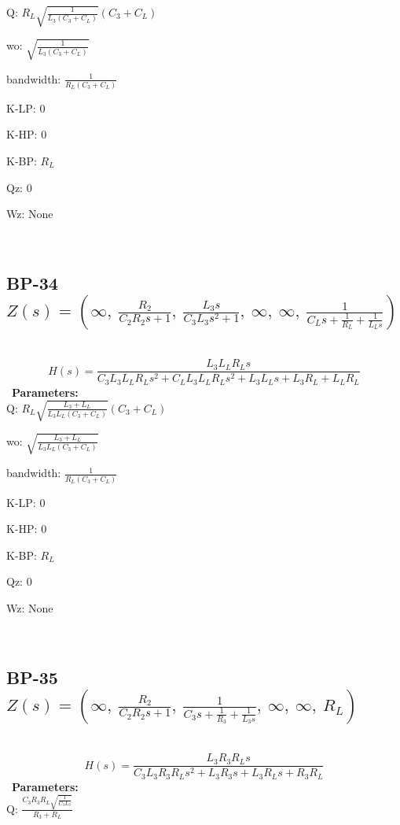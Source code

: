 \documentclass{article}
\begin{document}
Q: $R_{L} \sqrt{\frac{1}{L_{3} \left(C_{3} + C_{L}\right)}} \left(C_{3} + C_{L}\right)$\ 

wo: $\sqrt{\frac{1}{L_{3} \left(C_{3} + C_{L}\right)}}$\ 

bandwidth: $\frac{1}{R_{L} \left(C_{3} + C_{L}\right)}$\ 

K-LP: $0$\ 

K-HP: $0$\ 

K-BP: $R_{L}$\ 

Qz: $0$\ 

Wz: $\text{None}$\ 

\ 

\subsection{BP-34 $Z(s) = \left( \infty, \  \frac{R_{2}}{C_{2} R_{2} s + 1}, \  \frac{L_{3} s}{C_{3} L_{3} s^{2} + 1}, \  \infty, \  \infty, \  \frac{1}{C_{L} s + \frac{1}{R_{L}} + \frac{1}{L_{L} s}}\right)$ } \ 
\textbf{\[H(s) = \frac{L_{3} L_{L} R_{L} s}{C_{3} L_{3} L_{L} R_{L} s^{2} + C_{L} L_{3} L_{L} R_{L} s^{2} + L_{3} L_{L} s + L_{3} R_{L} + L_{L} R_{L}}\] } \ 
\textbf{Parameters:}\\ 

Q: $R_{L} \sqrt{\frac{L_{3} + L_{L}}{L_{3} L_{L} \left(C_{3} + C_{L}\right)}} \left(C_{3} + C_{L}\right)$\ 

wo: $\sqrt{\frac{L_{3} + L_{L}}{L_{3} L_{L} \left(C_{3} + C_{L}\right)}}$\ 

bandwidth: $\frac{1}{R_{L} \left(C_{3} + C_{L}\right)}$\ 

K-LP: $0$\ 

K-HP: $0$\ 

K-BP: $R_{L}$\ 

Qz: $0$\ 

Wz: $\text{None}$\ 

\ 

\subsection{BP-35 $Z(s) = \left( \infty, \  \frac{R_{2}}{C_{2} R_{2} s + 1}, \  \frac{1}{C_{3} s + \frac{1}{R_{3}} + \frac{1}{L_{3} s}}, \  \infty, \  \infty, \  R_{L}\right)$ } \ 
\textbf{\[H(s) = \frac{L_{3} R_{3} R_{L} s}{C_{3} L_{3} R_{3} R_{L} s^{2} + L_{3} R_{3} s + L_{3} R_{L} s + R_{3} R_{L}}\] } \ 
\textbf{Parameters:}\\ 

Q: $\frac{C_{3} R_{3} R_{L} \sqrt{\frac{1}{C_{3} L_{3}}}}{R_{3} + R_{L}}$\ 
\end{document}
